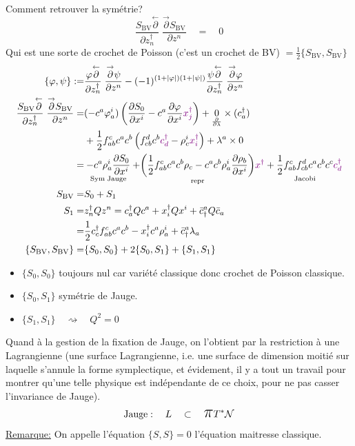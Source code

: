 \documentclass[a4paper,11pt]{article}
\newcommand{\dr}[2]{\frac{\partial {#1}}{\partial{#2}}}
\newcommand{\ppi}{{\mathlarger{\mathlarger{\mathlarger{\pi}}}}}
\begin{document}
\noindent Comment retrouver la symétrie?
$$\frac{S_\mathrm{BV}\overset\leftarrow\partial}{\partial z_n^\dag}\;\frac{\overset\to\partial S_\mathrm{BV}}{\partial z^n} \quad = \quad 0$$
Qui est une sorte de crochet de Poisson (c'est un crochet de BV) $=\frac12 \{S_\mathrm{BV},S_\mathrm{BV}\}$
\begin{align*}
\{\varphi,\psi\} :=& \frac{\varphi\overset\leftarrow\partial}{\partial z_n^\dag}\;\frac{\overset\to\partial \psi}{\partial z^n} - (-1)^{(1+|\varphi|)(1+|\psi|)}\frac{\psi\overset\leftarrow\partial}{\partial z_n^\dag}\;\frac{\overset\to\partial \varphi}{\partial z^n}\\
\frac{S_\mathrm{BV}\overset\leftarrow\partial}{\partial z_n^\dag}\;\frac{\overset\to\partial S_\mathrm{BV}}{\partial z^n} =& 
(-c^a\varphi^i_a) \left(\dr{S_0}{x^i} - c^a\dr\varphi{x^i} \color{violet}x^\dag_j\color{black}\right) + \underset{\dr{}\lambda}0\times (c_a^\dag)\\
&+\frac12 f^c_{ab}c^ac^b\left(f^d_{cb}c^b\color{violet}c^\dag_d\color{black}-\rho^i_c\color{violet}x^\dag_i\color{black}\right) + \lambda^a \times 0\\
=& \underset{\mathrm{Sym}\;\mathrm{Jauge}}{-c^a\rho^i_a \dr{S_0}{x^i}} + \underset{\mathrm{repr}}{\left(\frac12 f^c_{ab}c^ac^b\rho_c - c^ac^b\rho^i_a \dr{\rho_b}{x^i}\right)}\color{violet}x^\dag\color{black} + \underset{\mathrm{Jacobi}}{\frac12 f^c_{ab}f^d_{cb} c^ac^bc^c} \color{violet}c_d^\dag\\
S_\mathrm{BV} =& S_0 + S_1\\
S_1 =& z_n^\dag Q z^n = c_a^\dag Q c^a+x_i^\dag Qx^i+\bar c^a_\dag Q \bar c_a\\
=& \frac12 c_c^\dag f^c_{ab}c^ac^b - x_i^\dag c^a\rho^i_a+\bar c_\dag^a\lambda_a\\
\{S_\mathrm{BV},S_\mathrm{BV}\} =& \{S_0,S_0\} + 2\{S_0,S_1\} + \{S_1,S_1\}
\end{align*}
\begin{itemize}
\item $\{S_0,S_0\}$ toujours nul car variété classique donc crochet de Poisson classique.
\item $\{S_0,S_1\}$ symétrie de Jauge.
\item $\{S_1,S_1\} \quad \rightsquigarrow\quad Q^2=0$
\end{itemize}

Quand à la gestion de la fixation de Jauge, on l'obtient par la restriction à une Lagrangienne (une surface Lagrangienne, i.e. une surface de dimension moitié sur laquelle s'annule la forme symplectique, et évidement, il y a tout un travail pour montrer qu'une telle physique est indépendante de ce choix, pour ne pas casser l'invariance de Jauge).
$$\mathrm{Jauge}: \quad L \quad \subset \quad \ppi T^* \mathcal{N}$$
\underline{Remarque:} On appelle l'équation $\{S,S\}=0$ l'équation maitresse classique.\\
\end{document}
